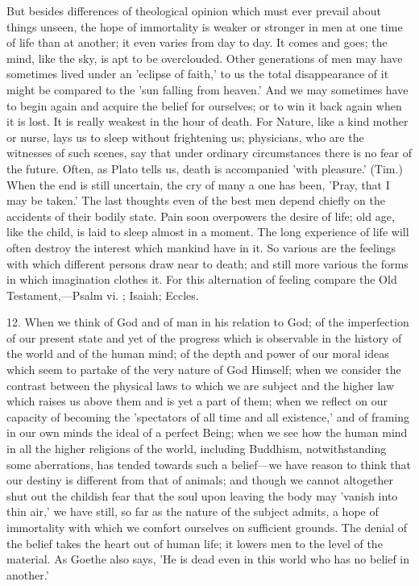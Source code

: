 \documentclass[11pt,letter]{article}
\begin{document}
\par  But besides differences of theological opinion which must ever prevail about things unseen, the hope of immortality is weaker or stronger in men at one time of life than at another; it even varies from day to day. It comes and goes; the mind, like the sky, is apt to be overclouded. Other generations of men may have sometimes lived under an 'eclipse of faith,' to us the total disappearance of it might be compared to the 'sun falling from heaven.' And we may sometimes have to begin again and acquire the belief for ourselves; or to win it back again when it is lost. It is really weakest in the hour of death. For Nature, like a kind mother or nurse, lays us to sleep without frightening us; physicians, who are the witnesses of such scenes, say that under ordinary circumstances there is no fear of the future. Often, as Plato tells us, death is accompanied 'with pleasure.' (Tim.) When the end is still uncertain, the cry of many a one has been, 'Pray, that I may be taken.' The last thoughts even of the best men depend chiefly on the accidents of their bodily state. Pain soon overpowers the desire of life; old age, like the child, is laid to sleep almost in a moment. The long experience of life will often destroy the interest which mankind have in it. So various are the feelings with which different persons draw near to death; and still more various the forms in which imagination clothes it. For this alternation of feeling compare the Old Testament,—Psalm vi. ; Isaiah; Eccles.

\par  12. When we think of God and of man in his relation to God; of the imperfection of our present state and yet of the progress which is observable in the history of the world and of the human mind; of the depth and power of our moral ideas which seem to partake of the very nature of God Himself; when we consider the contrast between the physical laws to which we are subject and the higher law which raises us above them and is yet a part of them; when we reflect on our capacity of becoming the 'spectators of all time and all existence,' and of framing in our own minds the ideal of a perfect Being; when we see how the human mind in all the higher religions of the world, including Buddhism, notwithstanding some aberrations, has tended towards such a belief—we have reason to think that our destiny is different from that of animals; and though we cannot altogether shut out the childish fear that the soul upon leaving the body may 'vanish into thin air,' we have still, so far as the nature of the subject admits, a hope of immortality with which we comfort ourselves on sufficient grounds. The denial of the belief takes the heart out of human life; it lowers men to the level of the material. As Goethe also says, 'He is dead even in this world who has no belief in another.'
\end{document}
